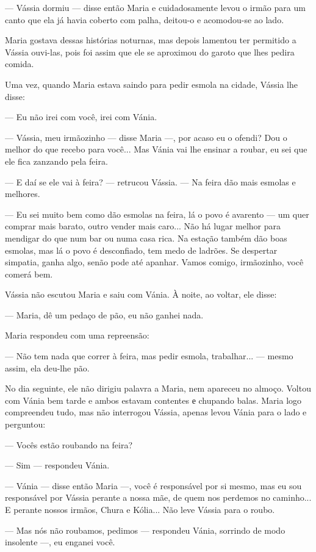 --- Vássia dormiu --- disse então Maria e cuidadosamente levou o irmão
para um canto que ela já havia coberto com palha, deitou-o e acomodou-se
ao lado.

Maria gostava dessas histórias noturnas, mas depois lamentou ter
permitido a Vássia ouvi-las, pois foi assim que ele se aproximou do
garoto que lhes pedira comida.

Uma vez, quando Maria estava saindo para pedir esmola na cidade, Vássia
lhe disse:

--- Eu não irei com você, irei com Vánia.

--- Vássia, meu irmãozinho --- disse Maria ---, por acaso eu o ofendi?
Dou o melhor do que recebo para você... Mas Vánia vai lhe ensinar a
roubar, eu sei que ele fica zanzando pela feira.

--- E daí se ele vai à feira? --- retrucou Vássia. --- Na feira dão mais
esmolas e melhores.

--- Eu sei muito bem como dão esmolas na feira, lá o povo é avarento ---
um quer comprar mais barato, outro vender mais caro... Não há lugar
melhor para mendigar do que num bar ou numa casa rica. Na estação também
dão boas esmolas, mas lá o povo é desconfiado, tem medo de ladrões. Se
despertar simpatia, ganha algo, senão pode até apanhar. Vamos comigo,
irmãozinho, você comerá bem.

Vássia não escutou Maria e saiu com Vánia. À noite, ao voltar, ele
disse:

--- Maria, dê um pedaço de pão, eu não ganhei nada.

Maria respondeu com uma repreensão:

--- Não tem nada que correr à feira, mas pedir esmola, trabalhar... ---
mesmo assim, ela deu-lhe pão.

No dia seguinte, ele não dirigiu palavra a Maria, nem apareceu no
almoço. Voltou com Vánia bem tarde e ambos estavam contentes е chupando
balas. Maria logo compreendeu tudo, mas não interrogou Vássia, apenas
levou Vánia para o lado e perguntou:

--- Vocês estão roubando na feira?

--- Sim --- respondeu Vánia.

--- Vánia --- disse então Maria ---, você é responsável por si mesmo,
mas eu sou responsável por Vássia perante a nossa mãe, de quem nos
perdemos no caminho... E perante nossos irmãos, Chura e Kólia... Não
leve Vássia para o roubo.

--- Mas nós não roubamos, pedimos --- respondeu Vánia, sorrindo de modo
insolente ---, eu enganei você.

